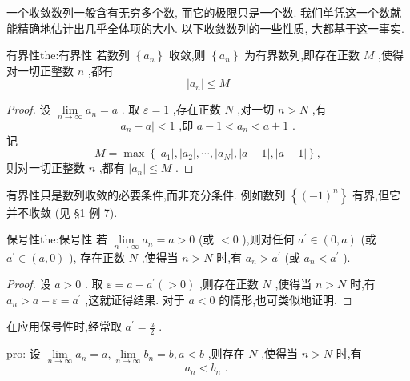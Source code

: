 一个收敛数列一般含有无穷多个数, 而它的极限只是一个数. 我们单凭这一个数就能精确地估计出几乎全体项的大小. 以下收敛数列的一些性质, 大都基于这一事实.

\begin{theorem}{有界性}{the:有界性}
若数列 \(\left\{  {a}_{n}\right\}\) 收敛,则 \(\left\{  {a}_{n}\right\}\) 为有界数列,即存在正数 \(M\) ,使得对一切正整数 \(n\) ,都有
\[
\left| {a}_{n}\right|  \leq  M
\]
\end{theorem}


\begin{proof}
设 \(\mathop{\lim }\limits_{{n \rightarrow  \infty }}{a}_{n} = a\) . 取 \(\varepsilon  = 1\) ,存在正数 \(N\) ,对一切 \(n > N\) ,有
\[
\left| {{a}_{n} - a}\right|  < 1\text{ ,即 }a - 1 < {a}_{n} < a + 1\text{ . }
\]
记
\[
M = \max \left\{  {\left| {a}_{1}\right| ,\left| {a}_{2}\right| ,\cdots ,\left| {a}_{N}\right| ,\left| {a - 1}\right| ,\left| {a + 1}\right| }\right\}  ,
\]
则对一切正整数 \(n\) ,都有 \(\left| {a}_{n}\right|  \leq  M\) .
\end{proof}


\begin{remark}
有界性只是数列收敛的必要条件,而非充分条件. 例如数列 \(\left\{  {\left( -1\right) }^{n}\right\}\) 有界,但它并不收敛 (见 §1 例 7).
\end{remark}


\begin{theorem}{保号性}{the:保号性}
若 \(\mathop{\lim }\limits_{{n \rightarrow  \infty }}{a}_{n} = a > 0\) (或 \(< 0\) ),则对任何 \({a}^{\prime } \in  \left( {0,a}\right)\) (或 \({a}^{\prime } \in  \left( {a,0}\right)\) ), 存在正数 \(N\) ,使得当 \(n > N\) 时,有 \({a}_{n} > {a}^{\prime }\) (或 \({a}_{n} < {a}^{\prime }\) ).
\end{theorem}

\begin{proof}
设 \(a > 0\) . 取 \(\varepsilon  = a - {a}^{\prime }\left( { > 0}\right)\) ,则存在正数 \(N\) ,使得当 \(n > N\) 时,有 \({a}_{n} > a - \varepsilon  = {a}^{\prime }\) ,这就证得结果. 对于 \(a < 0\) 的情形,也可类似地证明.
\end{proof}


\begin{remark}
在应用保号性时,经常取 \({a}^{\prime } = \frac{a}{2}\) .
\end{remark}


\begin{corollary}{}{pro:}
设 \(\mathop{\lim }\limits_{{n \rightarrow  \infty }}{a}_{n} = a,\mathop{\lim }\limits_{{n \rightarrow  \infty }}{b}_{n} = b,a < b\) ,则存在 \(N\) ,使得当 \(n > N\) 时,有
\[
{a}_{n} < {b}_{n}\text{ . }
\]
\end{corollary}

